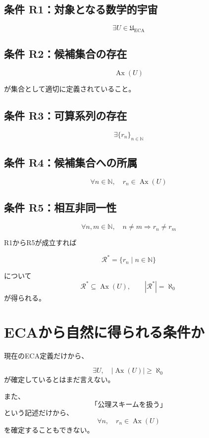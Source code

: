 \documentclass[a4paper,11pt]{article}
\begin{document}
\subsection*{条件 R1：対象となる数学的宇宙}

\[
\exists U\in\mathfrak U_{\mathrm{ECA}}
\]

\subsection*{条件 R2：候補集合の存在}

\[
\operatorname{Ax}(U)
\]

が集合として適切に定義されていること。

\subsection*{条件 R3：可算系列の存在}

\[
\exists\{r_n\}_{n\in\mathbb{N}}
\]

\subsection*{条件 R4：候補集合への所属}

\[
\forall n\in\mathbb{N},
\quad
r_n\in\operatorname{Ax}(U)
\]

\subsection*{条件 R5：相互非同一性}

\[
\forall n,m\in\mathbb{N},
\quad
n\neq m\Rightarrow r_n\neq r_m
\]

R1からR5が成立すれば

\[
\mathcal{R}^* = \{r_n\mid n\in\mathbb{N}\}
\]

について
\[
\boxed{\mathcal{R}^*\subseteq\operatorname{Ax}(U), \qquad |\mathcal{R}^*|=\aleph_0}
\]
が得られる。

\section{ECAから自然に得られる条件か}

現在のECA定義だけから、

\[
\exists U,\quad
|\operatorname{Ax}(U)|\ge\aleph_0
\]
が確定しているとはまだ言えない。

また、
\[
\text{「公理スキームを扱う」}
\]
という記述だけから、
\[
\forall n,\quad r_n\in\operatorname{Ax}(U)
\]
を確定することもできない。
\end{document}
